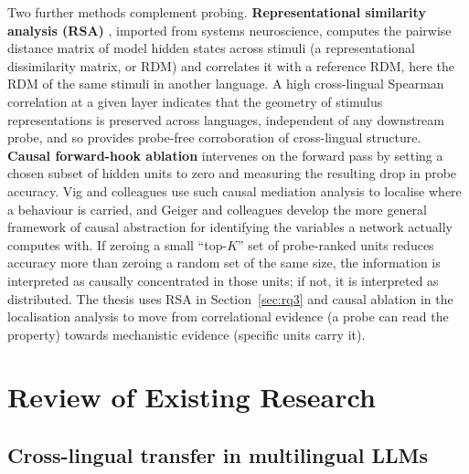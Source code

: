 Two further methods complement probing. \textbf{Representational similarity analysis (RSA)} \cite{kriegeskorte2008rsa}, imported from systems neuroscience, computes the pairwise distance matrix of model hidden states across stimuli (a representational dissimilarity matrix, or RDM) and correlates it with a reference RDM, here the RDM of the same stimuli in another language. A high cross-lingual Spearman correlation at a given layer indicates that the geometry of stimulus representations is preserved across languages, independent of any downstream probe, and so provides probe-free corroboration of cross-lingual structure. \textbf{Causal forward-hook ablation} \cite{geiger2021causal,vig2020investigating} intervenes on the forward pass by setting a chosen subset of hidden units to zero and measuring the resulting drop in probe accuracy. Vig and colleagues \cite{vig2020investigating} use such causal mediation analysis to localise where a behaviour is carried, and Geiger and colleagues \cite{geiger2021causal} develop the more general framework of causal abstraction for identifying the variables a network actually computes with. If zeroing a small ``top-$K$'' set of probe-ranked units reduces accuracy more than zeroing a random set of the same size, the information is interpreted as causally concentrated in those units; if not, it is interpreted as distributed. The thesis uses RSA in Section~\ref{sec:rq3} and causal ablation in the localisation analysis to move from correlational evidence (a probe can read the property) towards mechanistic evidence (specific units carry it).

\section{Review of Existing Research}

\subsection{Cross-lingual transfer in multilingual LLMs}

